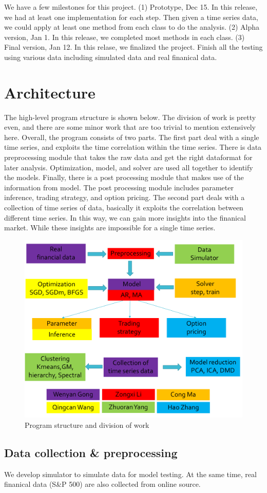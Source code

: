 \documentclass[12pt,a4paper]{article}
\begin{document}
We have a few milestones for this project. (1) Prototype, Dec 15. In this release, we had at least one implementation for each step. Then given a time series data, we could apply at least one method from each class to do the analysis. (2) Alpha version, Jan 1. In this release, we completed most methods in each class. (3) Final version, Jan 12.  In this relase, we finalized the project. Finish all the testing using various data including simulated data and real finanical data.

\section{Architecture}
The high-level program structure is shown below. The division of work is pretty even, and there are some minor work that are too trivial to mention extensively here. Overall, the program consists of two parts. The first part deal with a single time series, and exploits the time correlation within the time series. There is data preprocessing module that takes the raw data and get the right dataformat for later analysis. Optimization, model, and solver are used all together to identify the models. Finally, there is a post processing module that makes use of the information from model. The post processing module includes parameter inference, trading strategy, and option pricing. The second part deals with a collection of time series of data, basically it exploits the correlation between different time series. In this way, we can gain more insights into the finanical market. While these insights are impossible for a single time series.
\begin{figure}[H]
        \centering
     \includegraphics[width=.5\linewidth]{./Figure/structure.png}
\caption{Program structure and division of work}
\end{figure}

\subsection{Data collection \& preprocessing}
We develop simulator to simulate data for model testing. At the same time, real finanical data (S\&P 500) are also collected from online source.
\end{document}
